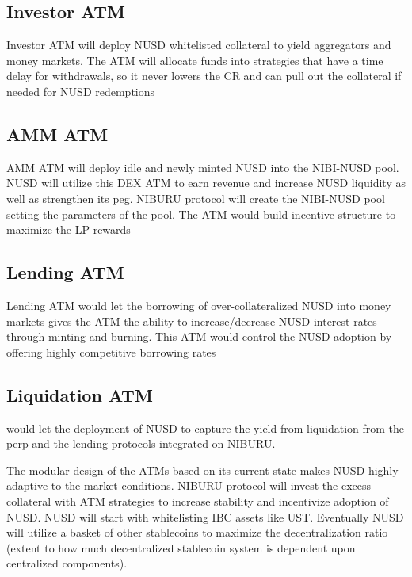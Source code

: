 \documentclass[11pt]{article}
\begin{document}
\subsection{Investor ATM} 
Investor ATM will deploy NUSD whitelisted collateral to yield aggregators and money markets. The ATM will allocate funds into strategies that have a time delay for withdrawals, so it never lowers the CR and can pull out the collateral if needed for NUSD redemptions

\subsection{AMM ATM} 
AMM ATM will deploy idle and newly minted NUSD into the NIBI-NUSD pool. NUSD will utilize this DEX ATM to earn revenue and increase NUSD liquidity as well as strengthen its peg. NIBURU protocol will create the NIBI-NUSD pool setting the parameters of the pool. The ATM would build incentive structure to maximize the LP rewards

\subsection{Lending ATM} 
Lending ATM would let the borrowing of over-collateralized NUSD into money markets gives the ATM the ability to increase/decrease NUSD interest rates through minting and burning. This ATM would control the NUSD adoption by offering highly competitive borrowing rates

\subsection{Liquidation ATM} 

would let the deployment of NUSD to capture the yield from liquidation from the perp and the lending protocols integrated on NIBURU. 

The modular design of the ATMs based on its current state makes NUSD highly adaptive to the market conditions. NIBURU protocol will invest the excess collateral with ATM strategies to increase stability and incentivize adoption of NUSD. NUSD will start with whitelisting IBC assets like UST. Eventually NUSD will utilize a basket of other stablecoins to maximize the decentralization ratio (extent to how much decentralized stablecoin system is dependent upon centralized components). 

\end{document}
